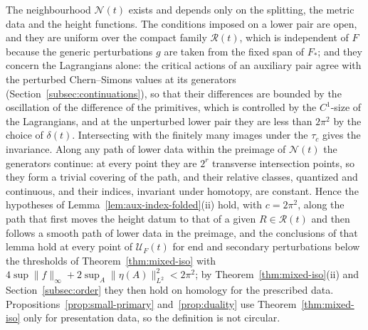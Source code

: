 \documentclass[11pt]{amsart}
\theoremstyle{definition}
\theoremstyle{remark}
\theoremstyle{plain}
\numberwithin{equation}{section}
\begin{document}
The neighbourhood $\mathcal N(t)$ exists and depends only on the splitting, the metric data and
the height functions. The conditions imposed on a lower pair are open, and they are uniform
over the compact family $\mathcal R(t)$, which is independent of $F$ because the generic
perturbations $g$ are taken from the fixed span of $F_*$; and they concern the Lagrangians
alone: the critical actions of an auxiliary pair agree with the perturbed Chern--Simons values
at its generators (Section~\ref{subsec:continuations}), so that their differences are bounded by
the oscillation of the difference of the primitives, which is controlled by the $C^1$-size of
the Lagrangians, and at the unperturbed lower pair they are less than $2\pi^2$ by the choice of
$\delta(t)$. Intersecting with the
finitely many images under the $\tau_c$ gives the invariance. Along any path of lower data
within the preimage of $\mathcal N(t)$ the generators continue: at every point they are $2^r$
transverse intersection points, so they form a trivial covering of the path, and their relative
classes, quantized and continuous, and their indices, invariant under homotopy, are constant.
Hence the hypotheses of Lemma~\ref{lem:aux-index-folded}(ii) hold, with $c=2\pi^2$, along the
path that first moves the height datum to that of a given $R\in\mathcal R(t)$ and then follows
a smooth path of lower data in the preimage, and the conclusions of that lemma hold at every
point of $\mathcal U_F(t)$ for end and secondary perturbations below the thresholds of
Theorem~\ref{thm:mixed-iso} with $4\sup\|f\|_\infty+2\sup_A\|\eta(A)\|^2_{L^2}<2\pi^2$; by
Theorem~\ref{thm:mixed-iso}(ii) and Section~\ref{subsec:order} they then hold on homology for
the prescribed data. Propositions~\ref{prop:small-primary} and~\ref{prop:duality} use
Theorem~\ref{thm:mixed-iso} only for presentation data, so the definition is not circular.
\end{document}
